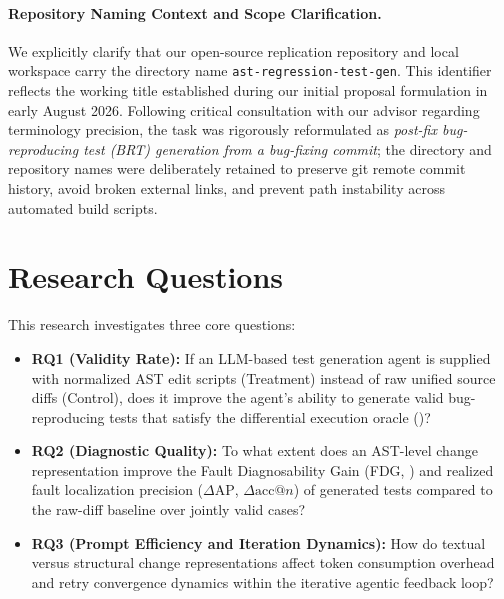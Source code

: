 \documentclass[12pt, a4paper]{article}
\begin{document}
\paragraph{Repository Naming Context and Scope Clarification.}
We explicitly clarify that our open-source replication repository and local workspace carry the directory name \texttt{ast-regression-test-gen}.
This identifier reflects the working title established during our initial proposal formulation in early August 2026.
Following critical consultation with our advisor regarding terminology precision, the task was rigorously reformulated as \emph{post-fix bug-reproducing test (BRT) generation from a bug-fixing commit}; the directory and repository names were deliberately retained to preserve git remote commit history, avoid broken external links, and prevent path instability across automated build scripts.

\section{Research Questions}\label{sec:rqs}

This research investigates three core questions:

\begin{itemize}[leftmargin=*]
  \item \textbf{RQ1 (Validity Rate):}
    If an LLM-based test generation agent is supplied with normalized AST edit scripts (Treatment) instead of raw unified source diffs (Control), does it improve the agent's ability to generate valid bug-reproducing tests that satisfy the differential execution oracle ()?

  \item \textbf{RQ2 (Diagnostic Quality):}
    To what extent does an AST-level change representation improve the Fault Diagnosability Gain (FDG, ) and realized fault localization precision ($\Delta\text{AP}$, $\Delta\text{acc@}n$) of generated tests compared to the raw-diff baseline over jointly valid cases?

  \item \textbf{RQ3 (Prompt Efficiency and Iteration Dynamics):}
    How do textual versus structural change representations affect token consumption overhead and retry convergence dynamics within the iterative agentic feedback loop?
\end{itemize}
\end{document}

